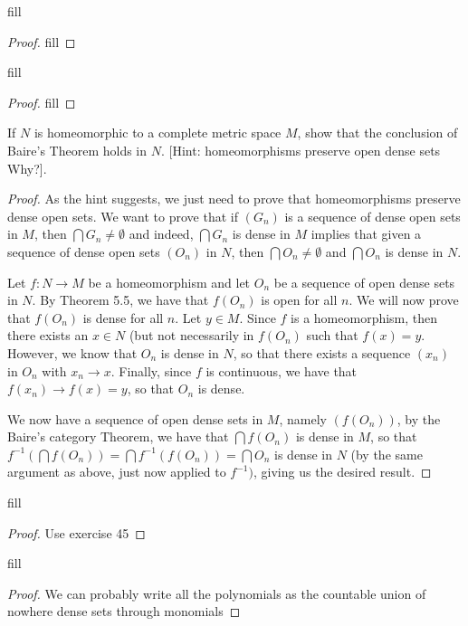 \begin{exercise}{40}
fill
\end{exercise}
\begin{proof}
fill
\end{proof} 

\begin{exercise}{42}
fill
\end{exercise}
\begin{proof}
fill
\end{proof} 

\begin{exercise}{43}
If $N$ is homeomorphic to a complete metric space $M$, show that the conclusion of Baire's Theorem holds in $N$.
[Hint: homeomorphisms preserve open dense sets
Why?].
\end{exercise}
\begin{proof}
As the hint suggests, we just need to prove that homeomorphisms preserve dense open sets.
We want to prove that if $(G_n)$ is a sequence of dense open sets in $M$, then $\bigcap G_n \neq \emptyset$ and indeed, $\bigcap G_n$ is dense in $M$ implies that given a sequence of dense open sets $(O_n)$ in $N$, then $\bigcap O_n \neq \emptyset$ and $\bigcap O_n$ is dense in $N$.

Let $f: N\to M$ be a homeomorphism and let $O_n$ be a sequence of open dense sets in $N$.
By Theorem 5.5, we have that $f(O_n)$ is open for all $n$.
We will now prove that $f(O_n)$ is dense for all $n$.
Let $y \in M$.
Since $f$ is a homeomorphism, then there exists an $x \in N$ (but not necessarily in $f(O_n)$ such that $f(x) = y$.
However, we know that $O_n$ is dense in $N$, so that there exists a sequence $(x_n)$ in $O_n$ with $x_n \to x$.
Finally, since $f$ is continuous, we have that $f(x_n) \to f(x) = y$, so that $O_n$ is dense.

We now have a sequence of open dense sets in $M$, namely $(f(O_n))$, by the Baire's category Theorem, we have that $\bigcap f(O_n)$ is dense in $M$, so that $f^{-1}(\bigcap f(O_n)) = \bigcap f^{-1}(f(O_n)) = \bigcap O_n$ is dense in $N$ (by the same argument as above, just now applied to $f^{-1})$, giving us the desired result.
\end{proof} 

\begin{exercise}{46}
fill
\end{exercise}
\begin{proof}
Use exercise 45
\end{proof} 

\begin{exercise}{47}
fill
\end{exercise}
\begin{proof}
We can probably write all the polynomials as the countable union of nowhere dense sets through monomials
\end{proof} 

